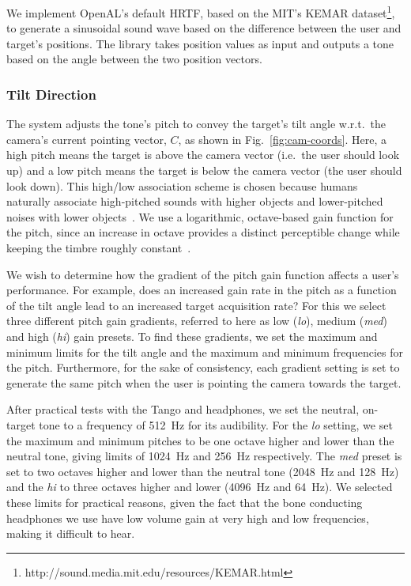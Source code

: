 \documentclass[sigconf, review=true, screen=true, anonymous=true]{acmart}
\begin{document}
We implement OpenAL's default HRTF, based on the MIT's KEMAR dataset\footnote{http://sound.media.mit.edu/resources/KEMAR.html}, to generate a sinusoidal sound wave based on the difference between the user and target's positions. The library takes position values as input and outputs a tone based on the angle between the two position vectors. 

\subsubsection{Tilt Direction}

The system adjusts the tone's pitch to convey the target's tilt angle w.r.t.\ the camera's current pointing vector, $C$, as shown in Fig.~\ref{fig:cam-coords}. Here, a high pitch means the target is above the camera vector (i.e.\ the user should look up) and a low pitch means the target is below the camera vector (the user should look down). This high/low association scheme is chosen because humans naturally associate high-pitched sounds with higher objects and lower-pitched noises with lower objects~\cite{pratt1930spatial, blauert1997spatial}. We use a logarithmic, octave-based gain function for the pitch, since an increase in octave provides a distinct perceptible change while keeping the timbre roughly constant~\cite{shepard1964circularity}.

We wish to determine how the gradient of the pitch gain function affects a user's performance. For example, does an increased gain rate in the pitch as a function of the tilt angle lead to an increased target acquisition rate? For this we select three different pitch gain gradients, referred to here as low (\emph{lo}), medium (\emph{med}) and high (\emph{hi}) gain presets. To find these gradients, we set the maximum and minimum limits for the tilt angle and the maximum and minimum frequencies for the pitch. Furthermore, for the sake of consistency, each gradient setting is set to generate the same pitch when the user is pointing the camera towards the target. 

After practical tests with the Tango and headphones, we set the neutral, on-target tone to a frequency of \SI{512}{\hertz} for its audibility. For the \emph{lo} setting, we set the maximum and minimum pitches to be one octave higher and lower than the neutral tone, giving limits of \SI{1024}{\hertz} and \SI{256}{\hertz} respectively. The \emph{med} preset is set to two octaves higher and lower than the neutral tone (\SI{2048}{\hertz} and \SI{128}{\hertz}) and the \emph{hi} to three octaves higher and lower (\SI{4096}{\hertz} and \SI{64}{\hertz}). We selected these limits for practical reasons, given the fact that the bone conducting headphones we use have low volume gain at very high and low frequencies, making it difficult to hear. 
\end{document}
